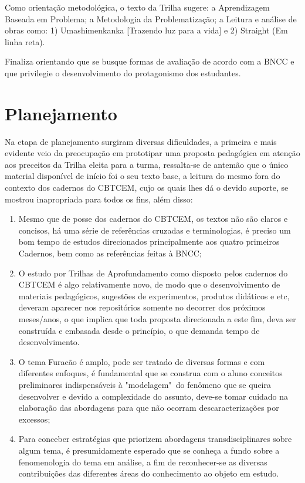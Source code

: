 Como orientação metodológica, o texto da Trilha sugere: a Aprendizagem Baseada em Problema; a Metodologia da Problematização; a Leitura e análise de obras como: 1) Umashimenkanka [Trazendo luz para a vida] e 2) Straight (Em linha reta).

Finaliza orientando que se busque formas de avaliação de acordo com a \ac{BNCC} e que privilegie o desenvolvimento do protagonismo dos estudantes.


\section{Planejamento} %
Na etapa de planejamento surgiram diversas dificuldades, a primeira e mais evidente veio da preocupação em prototipar uma proposta pedagógica em atenção aos preceitos da Trilha eleita para a turma, ressalta-se de antemão que o único material disponível de início foi o seu texto base, a leitura do mesmo fora do contexto dos cadernos do \ac{CBTCEM}, cujo os quais lhes dá o devido suporte, se mostrou inapropriada para todos os fins, além disso:
\begin{enumerate}[label=\alph *)]
	\item Mesmo que de posse dos cadernos do \ac{CBTCEM}, os textos não são claros e concisos, há uma série de referências cruzadas e terminologias, é preciso um bom tempo de estudos direcionados principalmente aos quatro primeiros Cadernos, bem como as referências feitas à \ac{BNCC};
	\item O estudo por Trilhas de Aprofundamento como disposto pelos cadernos do \ac{CBTCEM} é algo relativamente novo, de modo que o desenvolvimento de materiais pedagógicos, sugestões de experimentos, produtos didáticos e etc, deveram aparecer nos repositórios somente no decorrer dos próximos meses/anos, o que implica que toda proposta direcionada a este fim, deva ser construída e embasada desde o princípio, o que demanda tempo de desenvolvimento.
	\item O tema Furacão é amplo, pode ser tratado de diversas formas e com diferentes enfoques, é fundamental que se construa com o aluno conceitos preliminares indispensáveis à "modelagem"~do fenômeno que se queira desenvolver e devido a complexidade do assunto, deve-se tomar cuidado na elaboração das abordagens para que não ocorram descaracterizações por excessos;
	\item Para conceber estratégias que priorizem abordagens transdisciplinares sobre algum tema, é presumidamente esperado que se conheça a fundo sobre a fenomenologia do tema em análise, a fim de reconhecer-se as diversas contribuições das diferentes áreas do conhecimento ao objeto em estudo. 
\end{enumerate}

